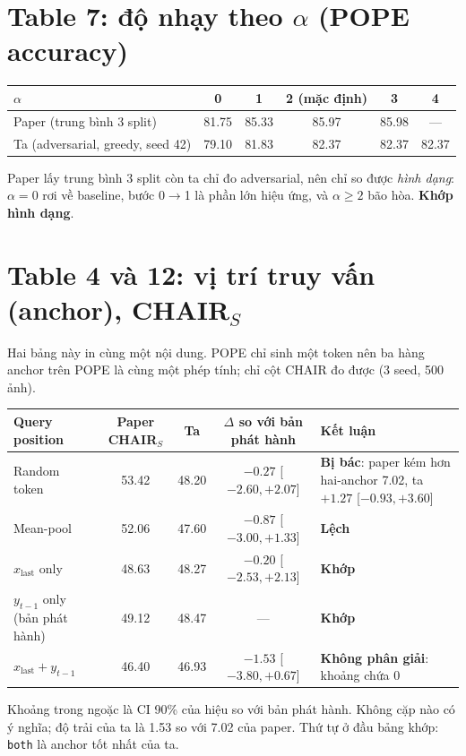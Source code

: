 \documentclass[10pt,a4paper]{article}
\newcommand{\ok}[1]{\textcolor{okc}{\textbf{#1}}}
\newcommand{\bad}[1]{\textcolor{badc}{\textbf{#1}}}
\newcommand{\warn}[1]{\textcolor{warnc}{\textbf{#1}}}
\begin{document}
\section{Table 7: độ nhạy theo $\alpha$ (POPE accuracy)}
\begin{center}\small
\begin{tabular}{@{}lccccc@{}}
\toprule
$\alpha$ & 0 & 1 & 2 (mặc định) & 3 & 4 \\
\midrule
Paper (trung bình 3 split) & 81.75 & 85.33 & 85.97 & 85.98 & --- \\
Ta (adversarial, greedy, seed 42) & 79.10 & 81.83 & 82.37 & 82.37 & 82.37 \\
\bottomrule
\end{tabular}
\end{center}
\noindent\small Paper lấy trung bình 3 split còn ta chỉ đo adversarial, nên chỉ so được \emph{hình dạng}: $\alpha=0$ rơi về baseline, bước 0$\to$1 là phần lớn hiệu ứng, và $\alpha\ge2$ bão hòa. \ok{Khớp hình dạng}.

\section{Table 4 và 12: vị trí truy vấn (anchor), CHAIR$_S$}
\noindent Hai bảng này in cùng một nội dung. POPE chỉ sinh một token nên ba hàng anchor trên POPE là cùng một phép tính; chỉ cột CHAIR đo được (3 seed, 500 ảnh).
\begin{center}\small
\begin{tabular}{@{}l c c c L{4.3cm}@{}}
\toprule
Query position & Paper CHAIR$_S$ & Ta & $\Delta$ so với bản phát hành & Kết luận \\
\midrule
Random token & 53.42 & 48.20 & $-0.27$ [$-2.60,+2.07$] & \bad{Bị bác}: paper kém hơn hai-anchor 7.02, ta $+1.27$ [$-0.93,+3.60$] \\
Mean-pool & 52.06 & 47.60 & $-0.87$ [$-3.00,+1.33$] & \warn{Lệch} \\
$x_{\mathrm{last}}$ only & 48.63 & 48.27 & $-0.20$ [$-2.53,+2.13$] & \ok{Khớp} \\
$y_{t-1}$ only (bản phát hành) & 49.12 & 48.47 & --- & \ok{Khớp} \\
$x_{\mathrm{last}}+y_{t-1}$ & 46.40 & 46.93 & $-1.53$ [$-3.80,+0.67$] & \warn{Không phân giải}: khoảng chứa 0 \\
\bottomrule
\end{tabular}
\end{center}
\noindent\small Khoảng trong ngoặc là CI 90\% của hiệu so với bản phát hành. Không cặp nào có ý nghĩa; độ trải của ta là 1.53 so với 7.02 của paper. Thứ tự ở đầu bảng khớp: \texttt{both} là anchor tốt nhất của ta.
\end{document}
